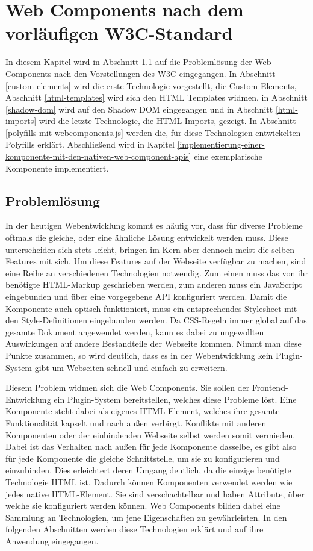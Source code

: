 \chapter{Web Components nach dem vorläufigen W3C-Standard}\label{web-components-nach-w3c}

In diesem Kapitel wird in Abschnitt \ref{problemloesung} auf die Problemlösung der Web Components nach den Vorstellungen des \ac{W3C} eingegangen. In Abschnitt \ref{custom-elements} wird die erste Technologie vorgestellt, die Custom Elements, Abschnitt \ref{html-templates} wird sich den \ac{HTML} Templates widmen, in Abschnitt \ref{shadow-dom} wird auf den Shadow \ac{DOM} eingegangen und in Abschnitt \ref{html-imports} wird die letzte Technologie, die \ac{HTML} Imports, gezeigt. In Abschnitt \ref{polyfills-mit-webcomponents.js} werden die, für diese Technologien entwickelten Polyfills erklärt. Abschließend wird in Kapitel \ref{implementierung-einer-komponente-mit-den-nativen-web-component-apis} eine exemplarische Komponente implementiert.


\section{Problemlösung}\label{problemloesung}

In der heutigen Webentwicklung kommt es häufig vor, dass für diverse Probleme oftmals die gleiche, oder eine ähnliche Lösung entwickelt werden muss. Diese unterscheiden sich stets leicht, bringen im Kern aber dennoch meist die selben Features mit sich. Um diese Features auf der Webseite verfügbar zu machen, sind eine Reihe an verschiedenen Technologien notwendig. Zum einen muss das von ihr benötigte \ac{HTML}-Markup geschrieben werden, zum anderen muss ein JavaScript eingebunden und über eine vorgegebene \ac{API} konfiguriert werden. Damit die Komponente auch optisch funktioniert, muss ein entsprechendes Style\-sheet mit den Style-Definitionen eingebunden werden. Da \ac{CSS}-Regeln immer global auf das gesamte Dokument angewendet werden, kann es dabei zu ungewollten Auswirkungen auf andere Bestandteile der Webseite kommen. Nimmt man diese Punkte zusammen, so wird deutlich, dass es in der Webentwicklung kein Plugin-System gibt um Webseiten schnell und einfach zu erweitern.

Diesem Problem widmen sich die Web Components. Sie sollen der Frontend-Ent\-wick\-lung ein Plugin-System bereitstellen, welches diese Probleme löst. Eine Komponente steht dabei als eigenes \ac{HTML}-Element, welches ihre gesamte Funktionalität kapselt und nach außen verbirgt. Konflikte mit anderen Komponenten oder der einbindenden Webseite selbst werden somit vermieden. Dabei ist das Verhalten nach außen für jede Komponente dasselbe, es gibt also für jede Komponente die gleiche Schnittstelle, um sie zu konfigurieren und einzubinden. Dies erleichtert deren Umgang deutlich, da die einzige benötigte Technologie \ac{HTML} ist. Dadurch können Komponenten verwendet werden wie jedes native \ac{HTML}-Element. Sie sind verschachtelbar und haben Attribute, über welche sie konfiguriert werden können. Web Components bilden dabei eine Sammlung an Technologien, um jene Eigenschaften zu gewährleisten. In den folgenden Abschnitten werden diese Technologien erklärt und auf ihre Anwendung eingegangen.
